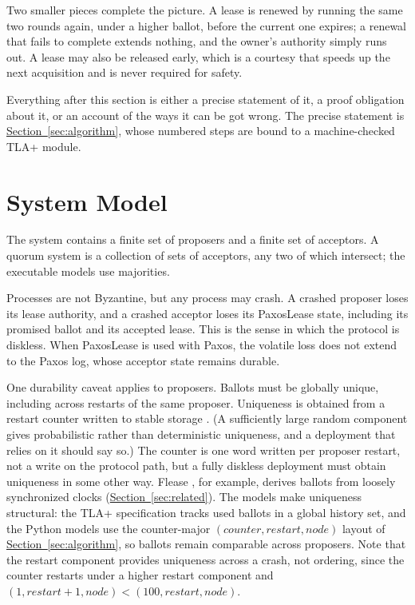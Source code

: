 \documentclass[final,5p,times,twocolumn,number]{elsarticle}
\newcommand{\secref}[1]{\hyperref[#1]{Section~\ref*{#1}}}
\begin{document}
Two smaller pieces complete the picture.  A lease is renewed by running the same two rounds again, under a higher ballot, before the current one expires; a renewal that fails to complete extends nothing, and the owner's authority simply runs out.  A lease may also be released early, which is a courtesy that speeds up the next acquisition and is never required for safety.

Everything after this section is either a precise statement of it, a proof obligation about it, or an account of the ways it can be got wrong.  The precise statement is \secref{sec:algorithm}, whose numbered steps are bound to a machine-checked TLA+ module.

\section{System Model}\label{sec:model}

The system contains a finite set of proposers and a finite set of acceptors.  A quorum system is a collection of sets of acceptors, any two of which intersect; the executable models use majorities.

Processes are not Byzantine, but any process may crash.  A crashed proposer loses its lease authority, and a crashed acceptor loses its PaxosLease state, including its promised ballot and its accepted lease.  This is the sense in which the protocol is diskless.  When PaxosLease is used with Paxos, the volatile loss does not extend to the Paxos log, whose acceptor state remains durable.

One durability caveat applies to proposers.  Ballots must be globally unique, including across restarts of the same proposer.  Uniqueness is obtained from a restart counter written to stable storage \cite{ref1}.  (A sufficiently large random component gives probabilistic rather than deterministic uniqueness, and a deployment that relies on it should say so.)  The counter is one word written per proposer restart, not a write on the protocol path, but a fully diskless deployment must obtain uniqueness in some other way.  Flease \cite{ref10}, for example, derives ballots from loosely synchronized clocks (\secref{sec:related}).  The models make uniqueness structural: the TLA+ specification tracks used ballots in a global history set, and the Python models use the counter-major $(counter, restart, node)$ layout of \secref{sec:algorithm}, so ballots remain comparable across proposers.  Note that the restart component provides uniqueness across a crash, not ordering, since the counter restarts under a higher restart component and $(1, restart{+}1, node) < (100, restart, node)$.
\end{document}
